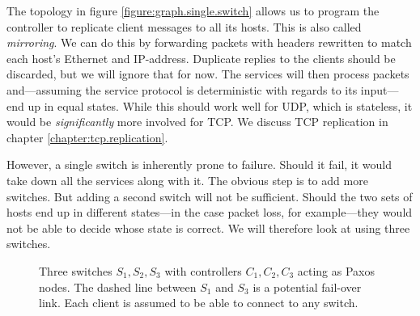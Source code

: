 The topology in figure \vref{figure:graph.single.switch} allows us to
program the controller to replicate client messages to all its hosts.
This is also called \textit{mirroring}.
%
We can do this by forwarding packets with headers rewritten to match each
host's Ethernet and IP-address.  Duplicate replies to the clients should be
discarded, but we will ignore that for now.
%
The services will then process packets and---assuming the service protocol
is deterministic with regards to its input---end up in equal states.
%
While this should work well for \acs{UDP}, which is
stateless, it would be \textit{significantly} more involved
for \acs{TCP}.  We discuss TCP replication in chapter
\vref{chapter:tcp.replication}.

However, a single switch is inherently prone to failure.  Should it fail, it
would take down all the services along with it.
%
The obvious step is to add more switches.
%
But adding a second switch will not be sufficient.  Should the two sets of
hosts end up in different states---in the case packet loss, for
example---they would not be able to decide whose state is correct.
%
We will therefore look at using three switches.

\begin{figure}[H]
  \centering
  \caption{Three switches $S_1, S_2, S_3$ with controllers $C_1, C_2, C_3$ acting as Paxos nodes.
           The dashed line between $S_1$ and $S_3$ is a potential fail-over
             link.  Each client is assumed to be able to connect to any
             switch.}
  \label{figure:graph.three.switches}
\end{figure}

